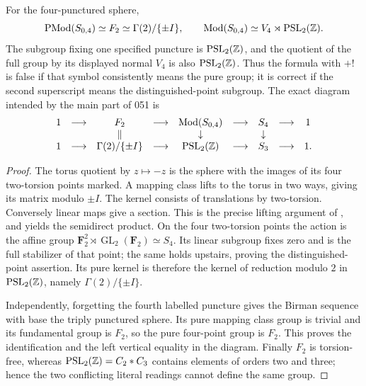 \begin{proposition}\label{A6-four-punctures}
For the four-punctured sphere,
\[
 \operatorname{PMod}(S_{0,4})\simeq F_2
 \simeq \Gamma(2)/\{\pm I\},
 \qquad
 \operatorname{Mod}(S_{0,4})
 \simeq V_4\rtimes\operatorname{PSL}_2({\mathbb{Z}}).
\]
The subgroup fixing one specified puncture is $\operatorname{PSL}_2({\mathbb{Z}})$, and the quotient of the full group by its displayed normal $V_4$ is also $\operatorname{PSL}_2({\mathbb{Z}})$. Thus the formula with $+!$ is false if that symbol consistently means the pure group; it is correct if the second superscript means the distinguished-point subgroup. The exact diagram intended by the main part of 051 is
\[
 \begin{array}{ccccccccc}
 1&\longrightarrow&F_2&\longrightarrow&
 \operatorname{Mod}(S_{0,4})&\longrightarrow&S_4&\longrightarrow&1\\
 &&\Vert&&\downarrow&&\downarrow\\
 1&\longrightarrow&\Gamma(2)/\{\pm I\}&\longrightarrow&
 \operatorname{PSL}_2({\mathbb{Z}})&\longrightarrow&S_3&\longrightarrow&1 .
 \end{array}
\]
\end{proposition}
\begin{proof}
The torus quotient by $z\mapsto-z$ is the sphere with the images of its four two-torsion points marked. A mapping class lifts to the torus in two ways, giving its matrix modulo $\pm I$. The kernel consists of translations by two-torsion. Conversely linear maps give a section. This is the precise lifting argument of \cite[Proposition 2.7]{FarbMargalit2012A567}, and yields the semidirect product. On the four two-torsion points the action is the affine group
$\mathbf F_2^2\rtimes\operatorname{GL}_2(\mathbf F_2)\simeq S_4$.
Its linear subgroup fixes zero and is the full stabilizer of that point; the same holds upstairs, proving the distinguished-point assertion. Its pure kernel is therefore the kernel of reduction modulo $2$ in $\operatorname{PSL}_2({\mathbb{Z}})$, namely $\Gamma(2)/\{\pm I\}$.

Independently, forgetting the fourth labelled puncture gives the Birman sequence with base the triply punctured sphere. Its pure mapping class group is trivial and its fundamental group is $F_2$, so the pure four-point group is $F_2$. This proves the identification and the left vertical equality in the diagram. Finally $F_2$ is torsion-free, whereas $\operatorname{PSL}_2({\mathbb{Z}})=C_2*C_3$ contains elements of orders two and three; hence the two conflicting literal readings cannot define the same group.
\end{proof}

